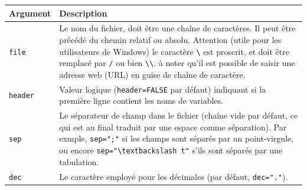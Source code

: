 \documentclass[
  11pt,
]{book}
\numberwithin{equation}{section}
\numberwithin{countremarque}{section}
\begin{document}
\begin{longtable}[]{@{}ll@{}}
\toprule
\begin{minipage}[b]{0.18\columnwidth}\raggedright
Argument\strut
\end{minipage} & \begin{minipage}[b]{0.76\columnwidth}\raggedright
Description\strut
\end{minipage}\tabularnewline
\midrule
\endhead
\begin{minipage}[t]{0.18\columnwidth}\raggedright
\texttt{file}\strut
\end{minipage} & \begin{minipage}[t]{0.76\columnwidth}\raggedright
Le nom du fichier, doit être une chaîne de caractères. Il peut être précédé du chemin relatif ou absolu. Attention (utile pour les utilisateurs de Windows) le caractère \texttt{\textbackslash{}} est proscrit, et doit être remplacé par \texttt{/} ou bien \texttt{\textbackslash{}\textbackslash{}}. à noter qu'il est possible de saisir une adresse web (URL) en guise de chaîne de caractère.\strut
\end{minipage}\tabularnewline
\begin{minipage}[t]{0.18\columnwidth}\raggedright
\texttt{header}\strut
\end{minipage} & \begin{minipage}[t]{0.76\columnwidth}\raggedright
Valeur logique (\texttt{header=FALSE} par défaut) indiquant si la première ligne contient les noms de variables.\strut
\end{minipage}\tabularnewline
\begin{minipage}[t]{0.18\columnwidth}\raggedright
\texttt{sep}\strut
\end{minipage} & \begin{minipage}[t]{0.76\columnwidth}\raggedright
Le séparateur de champ dans le fichier (chaîne vide par défaut, ce qui est au final traduit par une espace comme séparation). Par exmple, \texttt{sep=";"} si les champs sont séparés par un point-virgule, ou encore \texttt{sep="\textbackslash{}textbackslash\ t"} s'ils sont séparés par une tabulation.\strut
\end{minipage}\tabularnewline
\begin{minipage}[t]{0.18\columnwidth}\raggedright
\texttt{dec}\strut
\end{minipage} & \begin{minipage}[t]{0.76\columnwidth}\raggedright
Le caractère employé pour les décimales (par défaut, \texttt{dec="."}).\strut
\end{minipage}\tabularnewline

\end{longtable}
\end{document}

